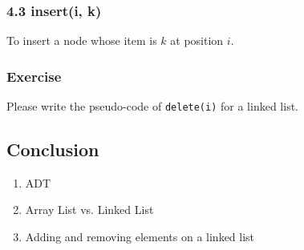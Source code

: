 \documentclass[aspectratio=169, 14pt]{beamer}
\begin{document}
\begin{frame}
    \frametitle{4.3 insert(i, k)}
To insert a node whose item is $k$ at position $i$.


\end{frame}

\begin{frame}
    \frametitle{Exercise}
    {\large {}} Please write the pseudo-code of \texttt{delete(i)} for a linked list.
\end{frame}

\begin{frame}

    \section{\textcolor{darkmidnightblue}{Conclusion}}  
\begin{enumerate}
    \item ADT
    \item Array List vs. Linked List
    \item Adding and removing elements on a linked list
\end{enumerate}
\end{frame}
\end{document}

